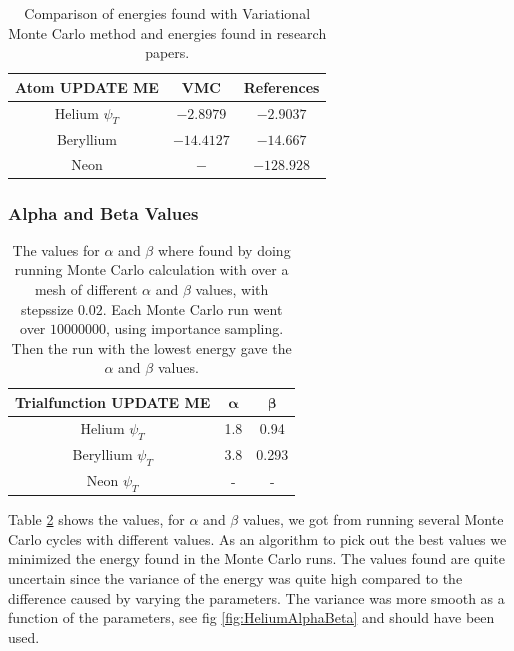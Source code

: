 		\begin{table}
			\centering
			\begin{tabular}{|c|c|c|}
				\hline
				Atom \textbf{UPDATE ME} & VMC & References\tabularnewline
				\hline
				\hline
				Helium $\psi_{T}$ & $-2.8979$ & $-2.9037$ \tabularnewline
				\hline
				Beryllium & $-14.4127$ & $-14.667$\tabularnewline
				\hline
				Neon & $ - $ & $ -128.928 $\tabularnewline
				\hline
			\end{tabular}
			\protect
			\caption{Comparison of energies found with Variational Monte Carlo method and
			energies found in research papers. 	\cite{QUA:QUA560090204}  	\cite{Koput:2011:PCCP}}
			\label{tab:energyReference1}
		\end{table}

		\subsubsection{Alpha and Beta Values}
			\begin{table}
				\center
				\begin{tabular}{| c | c| c |}
				    \hline
				   	\textbf{Trialfunction UPDATE ME} & \(\mathbf{\alpha}\) & \(\mathbf{\beta}\)
				    \\ \hline
				    Helium $\psi_{T}$ & 1.8 & 0.94
				    \\	\hline
				    Beryllium $\psi_{T}$	& 3.8	&	 0.293
				    \\ \hline
				    Neon $\psi_{T}$ & - & -
				    \\	\hline
		  		\end{tabular}
		  		\caption{The values for \(\alpha\) and \( \beta \) where found by doing running Monte Carlo calculation with over a mesh of different \(\alpha\) and \( \beta \) values, with stepssize \(0.02\). Each Monte Carlo run went over \(10 000 	000\), using importance sampling. Then the run with the lowest energy gave the \(\alpha\) and \(\beta\) values.}
			  	\label{tab:alpha_beta1}
			\end{table}

			Table \ref{tab:alpha_beta1} shows the values, for \(\alpha\) and \(\beta\) values, we got from  running several Monte Carlo cycles with different values. As an algorithm to pick out the best values we minimized the energy found in the Monte Carlo runs. The values found are quite uncertain since the variance of the energy was quite high compared to the difference caused by varying the parameters. The variance was more smooth as a function of the parameters, see fig \ref{fig:HeliumAlphaBeta} and should have been used.




